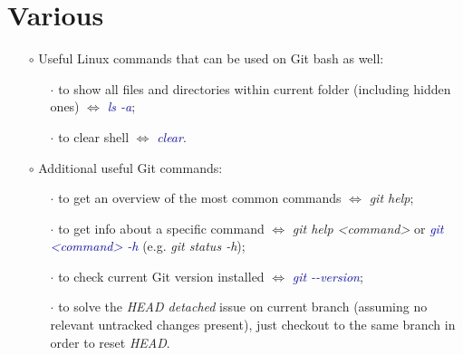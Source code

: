 \documentclass[a4paper,portrait,10pt]{article}   %
\newcommand{\mybulletlvA}{$\circ$}   %
\newcommand{\mybulletlvB}{$\cdot$}   %
\newcommand{\mydiv}{$\Leftrightarrow$ }   %
\newcommand{\mycmd}[1]{\textcolor{blue}{\textit{#1}}}   %
\newcommand{\myvspace}{\vspace{4mm}}   %
\begin{document}

\section{Various}   \label{sec:Various}

\begin{itemize}
\item[\mybulletlvA] Useful Linux commands that can be used on Git bash as well:
\begin{itemize}
  \item[\mybulletlvB] to show all files and directories within current folder (including hidden ones) \mydiv \mycmd{ls -a};
  \item[\mybulletlvB] to clear shell \mydiv \mycmd{clear}.
\end{itemize}
\myvspace

\item[\mybulletlvA] Additional useful Git commands:
\begin{itemize}
  \item[\mybulletlvB] to get an overview of the most common commands \mydiv \textit{git help};
  \item[\mybulletlvB] to get info about a specific command \mydiv \textit{git help <command>} or \mycmd{git <command> -h} (e.g. \textit{git status -h});
  \item[\mybulletlvB] to check current Git version installed \mydiv \mycmd{git -{}-version};
  \item[\mybulletlvB] to solve the \textit{HEAD detached} issue on current branch (assuming no relevant untracked changes present), just checkout to the same branch in order to reset \textit{HEAD}.
\end{itemize}
\myvspace


\end{itemize}
\end{document}
